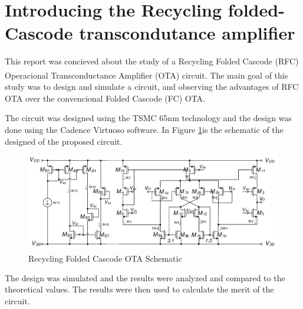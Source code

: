 \section{Introducing the Recycling folded-Cascode transcondutance amplifier}

This report was concieved about the study of a Recycling Folded Cascode (RFC) Operacional Transconductance Amplifier (OTA) circuit\textsuperscript{\cite{artigo-prof}}. The main goal of this study was to design and simulate a circuit, and observing the advantages of RFC OTA over the convencional Folded Cascode (FC) OTA. 

The circuit was designed using the TSMC 65nm technology and the design was done using the Cadence Virtuoso software. In Figure \ref{fig:OTA_schematic}is the schematic of the designed of the proposed circuit.

\begin{figure}[H]
    \centering
    \includegraphics[width=1\textwidth]{Images/RFC_OTA_schematic.png}
    \caption{Recycling Folded Cascode OTA Schematic\textsuperscript{\cite{Lab-statement}}}
    \label{fig:OTA_schematic}
\end{figure}

The design was simulated and the results were analyzed and compared to the theoretical values. The results were then used to calculate the merit of the circuit.

\pagebreak


